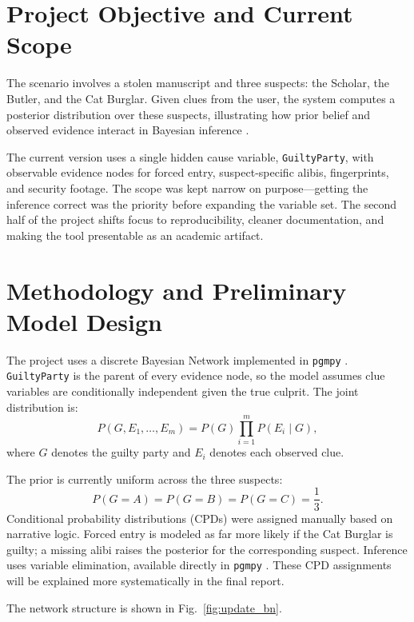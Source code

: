 \documentclass[conference]{IEEEtran}
\begin{document}
\section{Project Objective and Current Scope}
The scenario involves a stolen manuscript and three suspects: the Scholar, the Butler, and the Cat Burglar. Given clues from the user, the system computes a posterior distribution over these suspects, illustrating how prior belief and observed evidence interact in Bayesian inference \cite{zhang1996}.

The current version uses a single hidden cause variable, \texttt{GuiltyParty}, with observable evidence nodes for forced entry, suspect-specific alibis, fingerprints, and security footage. The scope was kept narrow on purpose---getting the inference correct was the priority before expanding the variable set. The second half of the project shifts focus to reproducibility, cleaner documentation, and making the tool presentable as an academic artifact.

\section{Methodology and Preliminary Model Design}
The project uses a discrete Bayesian Network implemented in \texttt{pgmpy} \cite{ankpan2015,pgmpydocs}. \texttt{GuiltyParty} is the parent of every evidence node, so the model assumes clue variables are conditionally independent given the true culprit. The joint distribution is:
\begin{equation}
P(G,E_1,\ldots,E_m)=P(G)\prod_{i=1}^{m}P(E_i \mid G),
\end{equation}
where \(G\) denotes the guilty party and \(E_i\) denotes each observed clue.

The prior is currently uniform across the three suspects:
\begin{equation}
P(G=A)=P(G=B)=P(G=C)=\frac{1}{3}.
\end{equation}
Conditional probability distributions (CPDs) were assigned manually based on narrative logic. Forced entry is modeled as far more likely if the Cat Burglar is guilty; a missing alibi raises the posterior for the corresponding suspect. Inference uses variable elimination, available directly in \texttt{pgmpy} \cite{pgmpydocs}. These CPD assignments will be explained more systematically in the final report.

The network structure is shown in Fig.~\ref{fig:update_bn}.
\end{document}
